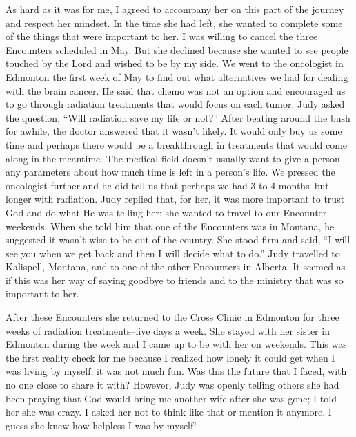 \documentclass[oneside]{book}
\begin{document}
As hard as it was for me, I agreed to accompany her on this part of the journey and respect her mindset. In the time she had left, she wanted to complete some of the things that were important to her. I was willing to cancel the three Encounters scheduled in May. But she declined because she wanted to see people touched by the Lord and wished to be by my side. We went to the oncologist in Edmonton the first week of May to find out what alternatives we had for dealing with the brain cancer. He said that chemo was not an option and encouraged us to go through radiation treatments that would focus on each tumor. Judy asked the question, “Will radiation save my life or not?” After beating around the bush for awhile, the doctor answered that it wasn’t likely. It would only buy us some time and perhaps there would be a breakthrough in treatments that would come along in the meantime. The medical field doesn’t usually want to give a person any parameters about how much time is left in a person’s life. We pressed the oncologist further and he did tell us that perhaps we had 3 to 4 months--but longer with radiation. Judy replied that, for her, it was more important to trust God and do what He was telling her; she wanted to travel to our Encounter weekends. When she told him that one of the Encounters was in Montana, he suggested it wasn’t wise to be out of the country. She stood firm and said, “I will see you when we get back and then I will decide what to do.” Judy travelled to Kalispell, Montana, and to one of the other Encounters in Alberta. It seemed as if this was her way of saying goodbye to friends and to the ministry that was so important to her. 

After these Encounters she returned to the Cross Clinic in Edmonton for three weeks of radiation treatments--five days a week. She stayed with her sister in Edmonton during the week and I came up to be with her on weekends. This was the first reality check for me because I realized how lonely it could get when I was living by myself; it was not much fun. Was this the future that I faced, with no one close to share it with? However, Judy was openly telling others she had been praying that God would bring me another wife after she was gone; I told her she was crazy. I asked her not to think like that or mention it anymore. I guess she knew how helpless I was by myself!
\end{document}
